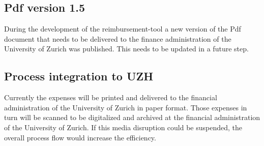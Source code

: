 \subsection{Pdf version 1.5}
During the development of the reimbursement-tool a new version of the Pdf document that needs to be delivered to the finance administration of the University of Zurich was published. This needs to be updated in a future step. 

\subsection{Process integration to UZH}
Currently the expenses will be printed and delivered to the financial administration of the University of Zurich in paper format. Those expenses in turn will be scanned to be digitalized and archived at the financial administration of the University of Zurich. If this media disruption could be suspended, the overall process flow would increase the efficiency.

